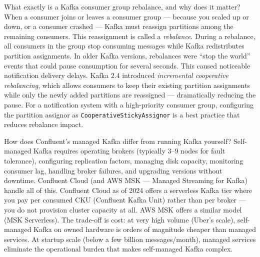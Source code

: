 \documentclass[11pt,a4paper]{article}
\begin{document}
\begin{curiobox}{What exactly is a Kafka consumer group rebalance, and why does it matter?}
When a consumer joins or leaves a consumer group --- because you scaled up or down, or a consumer crashed --- Kafka must reassign partitions among the remaining consumers. This reassignment is called a \textit{rebalance}. During a rebalance, all consumers in the group stop consuming messages while Kafka redistributes partition assignments. In older Kafka versions, rebalances were ``stop the world'' events that could pause consumption for several seconds. This caused noticeable notification delivery delays. Kafka 2.4 introduced \textit{incremental cooperative rebalancing}, which allows consumers to keep their existing partition assignments while only the newly added partitions are reassigned --- dramatically reducing the pause. For a notification system with a high-priority consumer group, configuring the partition assignor as \texttt{CooperativeStickyAssignor} is a best practice that reduces rebalance impact.
\end{curiobox}

\begin{curiobox}{How does Confluent's managed Kafka differ from running Kafka yourself?}
Self-managed Kafka requires operating brokers (typically 3--9 nodes for fault tolerance), configuring replication factors, managing disk capacity, monitoring consumer lag, handling broker failures, and upgrading versions without downtime. Confluent Cloud (and AWS MSK --- Managed Streaming for Kafka) handle all of this. Confluent Cloud as of 2024 offers a serverless Kafka tier where you pay per consumed CKU (Confluent Kafka Unit) rather than per broker --- you do not provision cluster capacity at all. AWS MSK offers a similar model (MSK Serverless). The trade-off is cost: at very high volume (Uber's scale), self-managed Kafka on owned hardware is orders of magnitude cheaper than managed services. At startup scale (below a few billion messages/month), managed services eliminate the operational burden that makes self-managed Kafka complex.
\end{curiobox}
\end{document}
